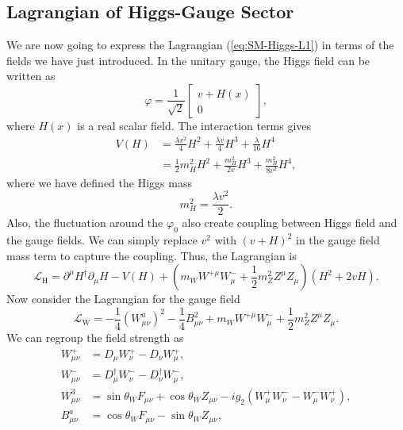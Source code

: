 \documentclass[aps,prb,superscriptaddress,nofootinbib]{revtex4}
\begin{document}
\subsection{Lagrangian of Higgs-Gauge Sector}
We are now going to express the Lagrangian (\ref{eq:SM-Higgs-L1}) in terms of the fields we have just introduced.
In the unitary gauge, the Higgs field can be written as
\begin{equation}
	\varphi = \frac{1}{\sqrt 2} \begin{bmatrix}
		v + H(x) \\ 0
	\end{bmatrix},
\end{equation}
where $H(x)$ is a real scalar field.
The interaction terms gives
\begin{equation}
\begin{aligned}
	V(H) &= \frac{\lambda v^2}{4} H^2 + \frac{\lambda v}{4}H^3 + \frac{\lambda}{16}H^4 \\
	&= \frac{1}{2}m_H^2 H^2 + \frac{m_H^2}{2v} H^3 + \frac{m_H^2}{8v^2}H^4,
\end{aligned} 
\end{equation}
where we have defined the Higgs mass
\begin{equation}
	m_H^2 = \frac{\lambda v^2}{2}.
\end{equation}
Also, the fluctuation around the $\varphi_0$ also create coupling between Higgs field and the gauge fields.
We can simply replace $v^2$ with $(v+H)^2$ in the gauge field mass term to capture the coupling.
Thus, the Lagrangian is
\begin{equation}
	\mathcal L_{\mathrm{H}} = \partial^\mu H^\dagger \partial_\mu H - V(H) + \left(m_W W^{+\mu} W_\mu^- + \frac{1}{2}m_Z^2 Z^\mu Z_\mu \right) \left(H^2+2vH \right).
\end{equation}
Now consider the Lagrangian for the gauge field
\begin{equation}
	\mathcal L_\mathrm{W} = -\frac{1}{4}(W^a_{\mu\nu})^2 - \frac{1}{4}B_{\mu\nu}^2 + m_W W^{+\mu} W_\mu^- + \frac{1}{2}m_Z^2 Z^\mu Z_\mu.
\end{equation}
We can regroup the field strength as
\begin{equation}
\begin{aligned}
	W^+_{\mu\nu} &= D_\mu W_\nu^+ - D_\nu W^+_\mu, \\
	W^-_{\mu\nu} &= D_\mu^\dagger W_\nu^- - D_\nu^\dagger W^-_\mu, \\
	W^3_{\mu\nu} &= \sin{\theta_W} F_{\mu\nu} + \cos{\theta_W}Z_{\mu\nu} -ig_2(W^+_\mu W^-_\nu - W_\mu^- W_\nu^+), \\
	B^a_{\mu\nu} &= \cos{\theta_W} F_{\mu\nu} - \sin{\theta_W} Z_{\mu\nu},
\end{aligned}
\end{equation}
\end{document}
